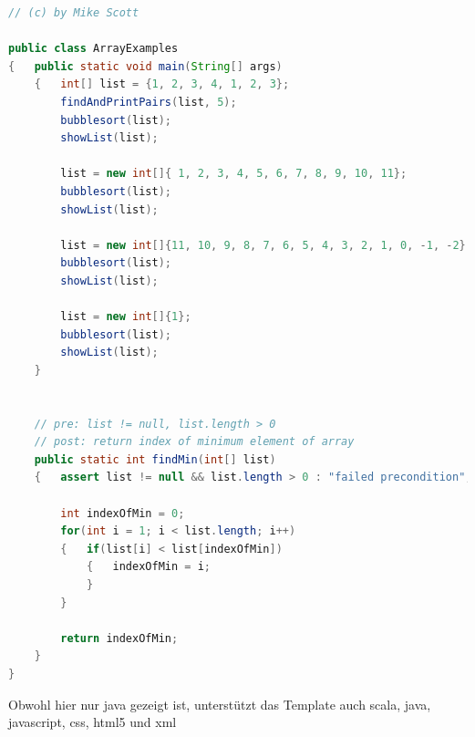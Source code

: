 \documentclass[
    headings=optiontotocandhead,%
    twoside,
    numbers=noenddot,%
    12pt, %
    titlepage, %
    parskip=full, %
    listof=leveldown, 
    numbers=noenddot, %
    a4paper,DIV=14,
    BCOR=15mm,
]{scrbook}
\begin{document}
\begin{lstlisting}[language=Java, caption={Examples of array manipulations}]
// (c) by Mike Scott

public class ArrayExamples
{   public static void main(String[] args)
    {   int[] list = {1, 2, 3, 4, 1, 2, 3};
        findAndPrintPairs(list, 5);
        bubblesort(list);
        showList(list);

        list = new int[]{ 1, 2, 3, 4, 5, 6, 7, 8, 9, 10, 11};
        bubblesort(list);
        showList(list);

        list = new int[]{11, 10, 9, 8, 7, 6, 5, 4, 3, 2, 1, 0, -1, -2};
        bubblesort(list);
        showList(list);

        list = new int[]{1};
        bubblesort(list);
        showList(list);
    }


    // pre: list != null, list.length > 0
    // post: return index of minimum element of array
    public static int findMin(int[] list)
    {   assert list != null && list.length > 0 : "failed precondition";

        int indexOfMin = 0;
        for(int i = 1; i < list.length; i++)
        {   if(list[i] < list[indexOfMin])
            {   indexOfMin = i;
            }
        }

        return indexOfMin;
    }
}
\end{lstlisting}

Obwohl hier nur java gezeigt ist, unterstützt das Template auch scala,
java, javascript, css, html5 und xml
\end{document}
